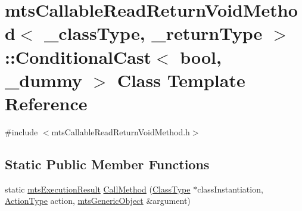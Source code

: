 \hypertarget{classmts_callable_read_return_void_method_1_1_conditional_cast}{\section{mts\-Callable\-Read\-Return\-Void\-Method$<$ \-\_\-class\-Type, \-\_\-return\-Type $>$\-:\-:Conditional\-Cast$<$ bool, \-\_\-dummy $>$ Class Template Reference}
\label{classmts_callable_read_return_void_method_1_1_conditional_cast}
}


{\ttfamily \#include $<$mts\-Callable\-Read\-Return\-Void\-Method.\-h$>$}

\subsection*{Static Public Member Functions}
\begin{DoxyCompactItemize}
\item 
static \hyperlink{classmts_execution_result}{mts\-Execution\-Result} \hyperlink{classmts_callable_read_return_void_method_1_1_conditional_cast_a99e4807f8515f7509d9816f1da2901c1}{Call\-Method} (\hyperlink{classmts_callable_read_return_void_method_a694e26a4c7fc28f0c739aa2f2ab97e12}{Class\-Type} $\ast$class\-Instantiation, \hyperlink{classmts_callable_read_return_void_method_a7f3934dc425501d4af892248c4930525}{Action\-Type} action, \hyperlink{classmts_generic_object}{mts\-Generic\-Object} \&argument)
\end{DoxyCompactItemize}


